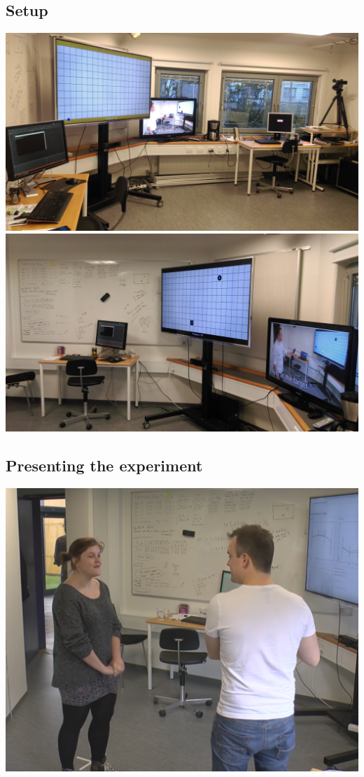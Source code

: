 \subsection*{\pictures}

\subsection*{Setup}
\includegraphics[width=\textwidth]{files/setup_left.jpg}
\includegraphics[width=\textwidth]{files/setup_right.jpg}

\subsection*{Presenting the experiment}
\includegraphics[width=\textwidth]{files/introduction.png}

